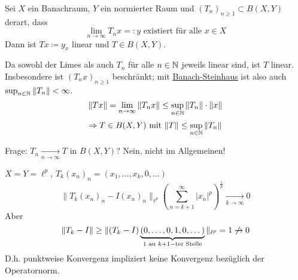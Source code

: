 \begin{kor} \label{kor:9.7}
	Sei $X$ ein Banachraum, $Y$ ein normierter Raum und $(T_{n})_{n \geq 1} \subset B(X, Y)$ derart, dass
	\[ \lim_{n \rightarrow \infty} T_{n} x =: y \text{ existiert für alle } x \in X \]
	Dann ist $T x \coloneqq y_{x}$ linear und $T \in B(X, Y)$.
	
	\begin{beweis}
		Da sowohl der Limes als auch $T_{n}$ für alle $n \in \mathbb{N}$ jeweils linear sind, ist $T$  linear. \\
		Insbesondere ist $(T_{n} x)_{n \geq 1}$ beschränkt; mit \hyperref[satz:9.5-Banach-Steinhaus]{Banach-Steinhaus} ist also auch $ \sup_{n \in \mathbb{N}} \| T_{n} \| < \infty$. \\
		\[ \| T x \| = \lim_{n \rightarrow \infty} \| T_{n} x \| \leq \sup_{n \in \mathbb{N}} \|T_{n} \| \cdot \|x \| \]
		\[ \Rightarrow T \in B(X, Y) \text{ mit } \| T \| \leq \sup_{n \in \mathbb{N}} \| T_{n} \|\]
	\end{beweis}
	Frage: $T_{n} \xrightarrow[n \rightarrow \infty]{} T$ in $B(X, Y)$? Nein, nicht im Allgemeinen! \\
\end{kor} 

\begin{beispiel*}
	$X = Y = \ell^{p}$, $T_{k} (x_{n})_{n} = (x_{1}, \dotsc, x_{k}, 0, \dotsc)$
	\[ \| T_{k} (x_{n})_{n} - I (x_{n})_{n} \|_{\ell^{p}} \left( \sum_{n = k + 1}^{\infty} | x_{n} |^{p} \right)^{\frac{1}{p}} \xrightarrow[k \rightarrow \infty]{} 0 \]
	Aber
		\[ \| T_{k} - I \| \geq \|(T_{k} - I)\underbrace{(0, \dotsc, 0, 1, 0, \dotsc)	}_{1 \text{ an } k+1-\text{ter Stelle}} \|_{\ell^{p}} = 1 \not\xrightarrow[ ~ ]{ } 0 \]
	D.h. punktweise Konvergenz impliziert keine Konvergenz bezüglich der Operatornorm.
\end{beispiel*}



\newpage	